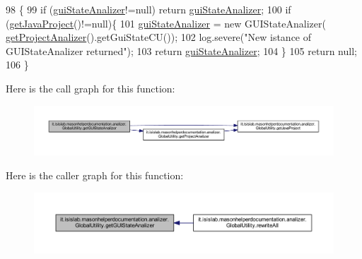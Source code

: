 \begin{DoxyCode}
98                                                         \{
99         \textcolor{keywordflow}{if} (\hyperlink{classit_1_1isislab_1_1masonhelperdocumentation_1_1analizer_1_1_global_utility_a0104f618583fd4e003dcc2b40ba5b8e8}{guiStateAnalizer}!=null) \textcolor{keywordflow}{return} \hyperlink{classit_1_1isislab_1_1masonhelperdocumentation_1_1analizer_1_1_global_utility_a0104f618583fd4e003dcc2b40ba5b8e8}{guiStateAnalizer};
100         \textcolor{keywordflow}{if} (\hyperlink{classit_1_1isislab_1_1masonhelperdocumentation_1_1analizer_1_1_global_utility_a1ce214dc72551ff78133933c461d4e59}{getJavaProject}()!=null)\{
101             \hyperlink{classit_1_1isislab_1_1masonhelperdocumentation_1_1analizer_1_1_global_utility_a0104f618583fd4e003dcc2b40ba5b8e8}{guiStateAnalizer} = \textcolor{keyword}{new} GUIStateAnalizer(
      \hyperlink{classit_1_1isislab_1_1masonhelperdocumentation_1_1analizer_1_1_global_utility_af6bcca0c06ec6fa8c2b2b88f5050914c}{getProjectAnalizer}().getGuiStateCU());        
102             log.severe(\textcolor{stringliteral}{"New istance of GUIStateAnalizer returned"});
103             \textcolor{keywordflow}{return} \hyperlink{classit_1_1isislab_1_1masonhelperdocumentation_1_1analizer_1_1_global_utility_a0104f618583fd4e003dcc2b40ba5b8e8}{guiStateAnalizer};
104         \}
105         \textcolor{keywordflow}{return} null;
106     \}
\end{DoxyCode}


Here is the call graph for this function\-:
\nopagebreak
\begin{figure}[H]
\begin{center}
\leavevmode
\includegraphics[width=350pt]{classit_1_1isislab_1_1masonhelperdocumentation_1_1analizer_1_1_global_utility_afcb5ea1aa5461f297ee3683d8528e6b9_cgraph}
\end{center}
\end{figure}




Here is the caller graph for this function\-:
\nopagebreak
\begin{figure}[H]
\begin{center}
\leavevmode
\includegraphics[width=350pt]{classit_1_1isislab_1_1masonhelperdocumentation_1_1analizer_1_1_global_utility_afcb5ea1aa5461f297ee3683d8528e6b9_icgraph}
\end{center}
\end{figure}


